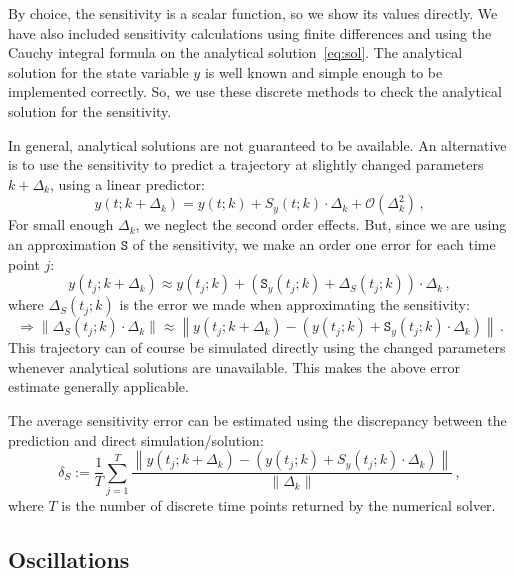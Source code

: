 \documentclass[utf8,english,DIV=12]{scrartcl}
\newcommand{\Sapprox}{\texttt{S}}
\begin{document}
By choice, the sensitivity is a scalar function, so we show its values
directly. We have also included sensitivity calculations using finite
differences and using the Cauchy integral formula on the analytical
solution~\eqref{eq:sol}. The analytical solution for the state
variable $y$ is well known and simple enough to be implemented
correctly. So, we use these discrete methods to check the
analytical solution for the sensitivity.

In general, analytical solutions are not guaranteed to be
available. An alternative is to use the sensitivity to predict a
trajectory at slightly changed parameters $k+\Delta_k$, using a linear
predictor:
\begin{equation}
  \label{eq:linear}
 y(t;k+\Delta_k) = 
 y(t;k)+S_y(t;k)\cdot\Delta_k + \mathcal{O}(\Delta_k^2)\,,
\end{equation}
For small enough $\Delta_k$, we neglect the second order effects.
But, since we are using an approximation $\Sapprox$ of the
sensitivity, we make an order one error for each time point $j$:
\begin{equation}
  \label{eq:SapproxError}
  y(t_j;k+\Delta_k)\approx
  y(t_j;k)+(\Sapprox_y(t_j;k) + \Delta_S(t_j;k))\cdot\Delta_k \,,
\end{equation}
where $\Delta_S(t_j;k)$ is the error we made when approximating the sensitivity:
\begin{equation}
  \label{eq:SapproxError}
\Rightarrow \|\Delta_{S}(t_j;k)\cdot\Delta_k\|\approx \left\|y(t_j;k+\Delta_k)
  - (y(t_j;k)+\Sapprox_y(t_j;k)\cdot\Delta_k) \right\|\,.
\end{equation}
This trajectory can of course be simulated directly using the changed
parameters whenever analytical solutions are unavailable. This makes
the above error estimate generally applicable.

The average sensitivity error can be estimated using the discrepancy between
the prediction and direct simulation/solution:
\begin{equation}
  \label{eq:linerr}
  \delta_S:=\frac{1}{T}\sum_{j=1}^T \frac{\left\| y(t_j;k+\Delta_k) - (y(t_j;k) + S_y(t_j;k)\cdot\Delta_k)\right\|}{\|\Delta_k\|}\,,
\end{equation}
where $T$ is the number of discrete time points returned by the numerical solver. 

\subsection{Oscillations}
\label{sec:nodamping}
\end{document}
